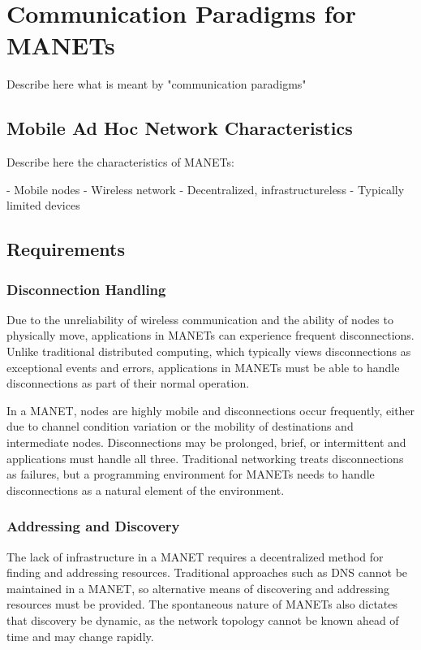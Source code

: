 \chapter{Communication Paradigms for MANETs}

Describe here what is meant by "communication paradigms"

\section{Mobile Ad Hoc Network Characteristics}

Describe here the characteristics of MANETs:

- Mobile nodes
- Wireless network
- Decentralized, infrastructureless
- Typically limited devices

\section{Requirements}\label{sec:manetrecs}

\subsection{Disconnection Handling}

Due to the unreliability of wireless communication and the ability of nodes to physically move, applications in MANETs can experience frequent disconnections.
Unlike traditional distributed computing, which typically views disconnections as exceptional events and errors, applications in MANETs must be able to handle disconnections as part of their normal operation.

In a MANET, nodes are highly mobile and disconnections occur frequently, either due to channel condition variation or the mobility of destinations and intermediate nodes. Disconnections may be prolonged, brief, or intermittent and applications must handle all three. Traditional networking treats disconnections as failures, but a programming environment for MANETs needs to handle disconnections as a natural element of the environment.

\subsection{Addressing and Discovery}

 The lack of infrastructure in a MANET requires a decentralized method for finding and addressing resources. Traditional approaches such as DNS cannot be maintained in a MANET, so alternative means of discovering and addressing resources must be provided. The spontaneous nature of MANETs also dictates that discovery be dynamic, as the network topology cannot be known ahead of time and may change rapidly.

